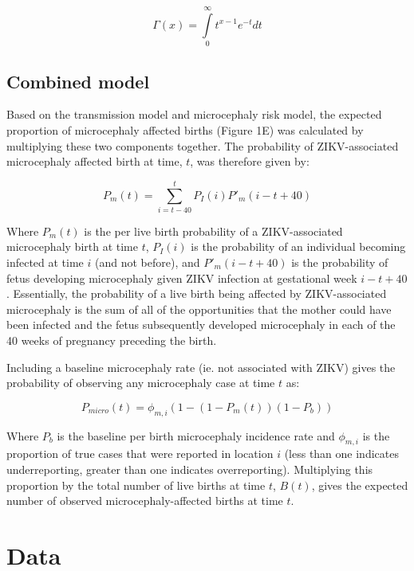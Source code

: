 \documentclass[10pt,letterpaper]{article}
\begin{document}
\begin{equation}
\Gamma ( x ) = \int\limits_0^\infty {t^{x - 1} } e^{ - t} dt
\end{equation}

\subsection{Combined model}\label{combined-model}

Based on the transmission model and microcephaly risk model, the
expected proportion of microcephaly affected births (Figure 1E) was
calculated by multiplying these two components together. The probability
of ZIKV-associated microcephaly affected birth at time, \(t\), was
therefore given by:

\begin{equation}
 P_m(t) = \sum^t_{i=t-40} P_I(i)P'_m(i - t + 40)
\end{equation}

Where \(P_m(t)\) is the per live birth probability of a ZIKV-associated
microcephaly birth at time \(t\), \(P_I(i)\) is the probability of an
individual becoming infected at time \(i\) (and not before), and
\(P'_m(i - t + 40)\) is the probability of fetus developing microcephaly
given ZIKV infection at gestational week \(i - t + 40\). Essentially,
the probability of a live birth being affected by ZIKV-associated
microcephaly is the sum of all of the opportunities that the mother
could have been infected and the fetus subsequently developed
microcephaly in each of the 40 weeks of pregnancy preceding the birth.

Including a baseline microcephaly rate (ie. not associated with ZIKV)
gives the probability of observing any microcephaly case at time \(t\)
as:

\begin{equation}
 P_{micro}(t) =\phi_{m,i}(1 - (1-P_m(t))(1-P_b))
\end{equation}

Where \(P_b\) is the baseline per birth microcephaly incidence rate and
\(\phi_{m,i}\) is the proportion of true cases that were reported in
location \(i\) (less than one indicates underreporting, greater than one
indicates overreporting). Multiplying this proportion by the total
number of live births at time \(t\), \(B(t)\), gives the expected number
of observed microcephaly-affected births at time \(t\).

\section{Data}\label{data}
\end{document}
